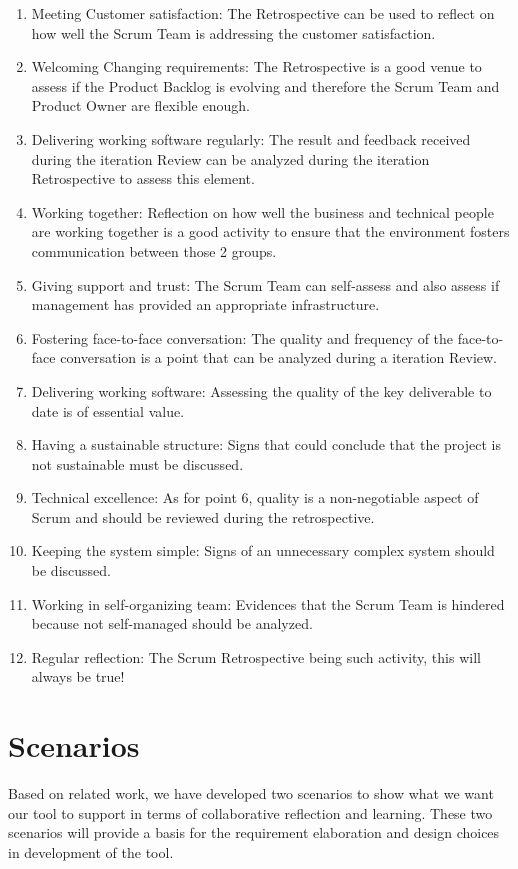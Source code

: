 \begin{enumerate}
\item Meeting Customer satisfaction: The Retrospective can be used to reflect on how well the Scrum Team is addressing the customer satisfaction.
\item Welcoming Changing requirements: The Retrospective is a good venue to assess if the Product Backlog is evolving and therefore the Scrum Team and Product Owner are flexible enough.
\item Delivering working software regularly: The result and feedback received during the iteration Review can be analyzed during the iteration Retrospective to assess this element.
\item Working together: Reflection on how well the business and technical people are working together is a good activity to ensure that the environment fosters communication between those 2 groups.
\item Giving support and trust: The Scrum Team can self-assess and also assess if management has provided an appropriate infrastructure.
\item Fostering face-to-face conversation: The quality and frequency of the face-to-face conversation is a point that can be analyzed during a iteration Review.
\item Delivering working software: Assessing the quality of the key deliverable to date is of essential value.
\item Having a sustainable structure: Signs that could conclude that the project is not sustainable must be discussed.
\item Technical excellence: As for point 6, quality is a non-negotiable aspect of Scrum and should be reviewed during the retrospective.
\item Keeping the system simple: Signs of an unnecessary complex system should be discussed.
\item Working in self-organizing team: Evidences that the Scrum Team is hindered because not self-managed should be analyzed.
\item Regular reflection: The Scrum Retrospective being such activity, this will always be true!
\end{enumerate}

\section{Scenarios}
\label{sec:scenarios}

Based on related work, we have developed two scenarios to show what we want our tool to support in terms of collaborative reflection and learning. These two scenarios will provide a basis for the requirement elaboration and design choices in development of the tool. 

